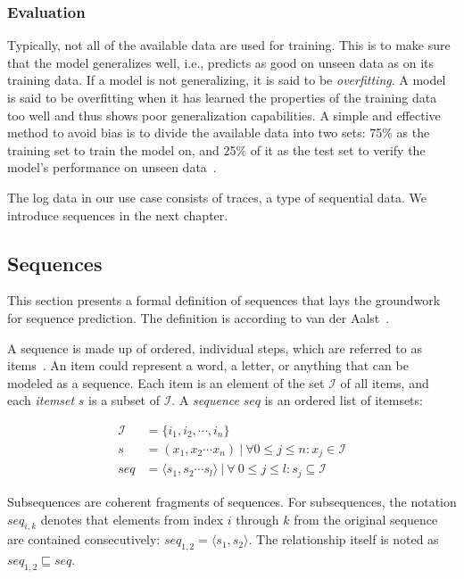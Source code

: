 \subsubsection*{Evaluation}
Typically, not all of the available data are used for training. This is to make sure that the model generalizes well, i.e., predicts as good on unseen data as on its training data. If a model is not generalizing, it is said to be \textit{overfitting}. A model is said to be overfitting when it has learned the properties of the training data too well and thus shows poor generalization capabilities. A simple and effective method to avoid bias is to divide the available data into two sets: 75\% as the training set to train the model on, and 25\% of it as the test set to verify the model's performance on unseen data~\cite{kuhn2013applied, lessmannBADS}.

The log data in our use case consists of traces, a type of sequential data.
We introduce sequences in the next chapter.

\subsection{Sequences}\label{sec:background:sequences}
This section presents a formal definition of sequences that lays the groundwork for sequence prediction. The definition is according to van der Aalst~\cite{Aalst2016}.

A sequence is made up of ordered, individual steps, which are referred to as items~\cite{han2000freespan}. An item could represent a word, a letter, or anything that can be modeled as a sequence. Each item is an element of the set $\mathscr{I}$ of all items, and each \textit{itemset} $s$ is a subset of $\mathscr{I}$. A \textit{sequence} $seq$ is an ordered list of itemsets:

\begin{equation*}
\begin{split}
\mathscr{I} &= \{i_1, i_2, \cdots, i_n\}\\
        s   &= (x_1,x_2\cdots x_n)\ |\ \forall 0 \leq j \leq n: x_j \in \mathscr{I}\\
        seq &= \langle s_1,s_2\cdots s_l \rangle\ |\ \forall\ 0 \leq j \leq l: s_j \subseteq \mathscr{I}
\end{split}
\end{equation*}

Subsequences are coherent fragments of sequences.
For  subsequences, the notation $seq_{i,k}$ denotes that elements from index $i$ through $k$ from the original sequence are contained consecutively: $seq_{1,2} = \langle s_1,s_2 \rangle$. The relationship itself is noted as $seq_{1,2} \sqsubseteq seq$.\\

